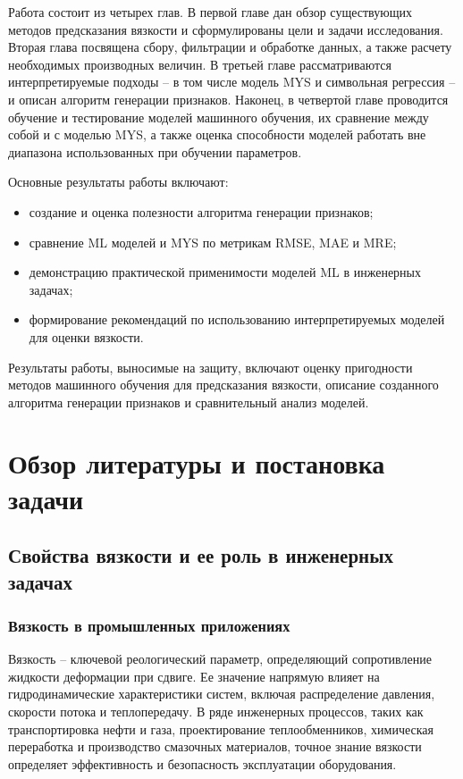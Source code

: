 \documentclass[a4paper,12pt]{article}
\begin{document}
  Работа состоит из четырех глав. В первой главе дан обзор существующих методов предсказания вязкости и сформулированы цели и задачи исследования. Вторая глава посвящена сбору, фильтрации и обработке данных, а также расчету необходимых производных величин. В третьей главе рассматриваются интерпретируемые подходы -- в том числе модель MYS и символьная регрессия -- и описан алгоритм генерации признаков. Наконец, в четвертой главе проводится обучение и тестирование моделей машинного обучения, их сравнение между собой и с моделью MYS, а также оценка способности моделей работать вне диапазона использованных при обучении параметров.

  Основные результаты работы включают:
  \begin{itemize}
    \item создание и оценка полезности алгоритма генерации признаков;
    \item сравнение ML моделей и MYS по метрикам RMSE, MAE и MRE;
    \item демонстрацию практической применимости моделей ML в инженерных задачах;
    \item формирование рекомендаций по использованию интерпретируемых моделей для оценки вязкости.
  \end{itemize}

  Результаты работы, выносимые на защиту, включают оценку пригодности методов машинного обучения для предсказания вязкости, описание созданного алгоритма генерации признаков и сравнительный анализ моделей.

\section{Обзор литературы и постановка задачи}
  \subsection{Свойства вязкости и ее роль в инженерных задачах}

    \subsubsection{Вязкость в промышленных приложениях}

      Вязкость -- ключевой реологический параметр, определяющий сопротивление жидкости деформации при сдвиге. Ее значение напрямую влияет на гидродинамические характеристики систем, включая распределение давления, скорости потока и теплопередачу. В ряде инженерных процессов, таких как транспортировка нефти и газа, проектирование теплообменников, химическая переработка и производство смазочных материалов, точное знание вязкости определяет эффективность и безопасность эксплуатации оборудования. 
\end{document}
